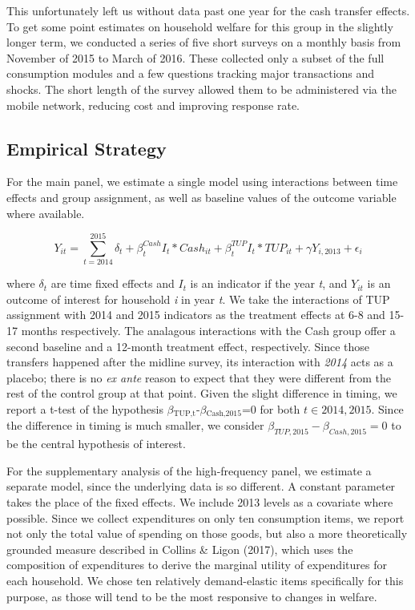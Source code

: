 \documentclass[12pt,article]{article}
\begin{document}
This unfortunately left us without data past one year for the cash transfer effects.
To get some point estimates on household welfare for this group in the slightly
longer term, we conducted a series of five short surveys on a monthly basis from
November of 2015 to March of 2016. These collected only a subset of the full
consumption modules and a few questions tracking major transactions and shocks. The
short length of the survey allowed them to be administered via the mobile network,
reducing cost and improving response rate.

\subsection{Empirical Strategy}
\label{sec-2-2}

For the main panel, we estimate a single model using interactions between time effects and group
assignment, as well as baseline values of the outcome variable where available. 

\begin{equation*}
Y_{it} =\sum_{t=2014}^{2015}\delta_{t}+\beta_{t}^{Cash}I_{t}*Cash_{it}+\beta_{t}^{TUP}I_{t}*TUP_{it}+\gamma Y_{i,2013}+\epsilon_{i}
\end{equation*}

where $\delta_{t}$ are time fixed effects and $I_{t}$ is an indicator if the year
\emph{t}, and $Y_{it}$ is an outcome of interest for household \emph{i} in year \emph{t}. We take
the interactions of TUP assignment with 2014 and 2015 indicators as the treatment
effects at 6-8 and 15-17 months respectively. The analagous interactions with the
Cash group offer a second baseline and a 12-month treatment effect, respectively.
Since those transfers happened after the midline survey, its interaction with \emph{2014}
acts as a placebo; there is no \emph{ex ante} reason to expect that they were different
from the rest of the control group at that point. Given the slight difference in
timing, we report a t-test of the hypothesis $\beta$$_{\text{TUP,t}}$-$\beta$$_{\text{Cash,2015}}$=0 for
both \(t \in {2014,2015}\). Since the difference in timing is much smaller, we consider
\(\beta_{TUP,2015}-\beta_{Cash,2015}=0\) to be the central hypothesis of interest.

For the supplementary analysis of the high-frequency panel, we estimate a separate
model, since the underlying data is so different. A constant parameter takes the
place of the fixed effects. We include 2013 levels as a covariate where possible.
Since we collect expenditures on only ten consumption items, we report not only the
total value of spending on those goods, but also a more theoretically grounded
measure described in Collins \& Ligon (2017), which uses the composition of
expenditures to derive the marginal utility of expenditures for each household. We
chose ten relatively demand-elastic items specifically for this purpose, as those
will tend to be the most responsive to changes in welfare.
\end{document}
